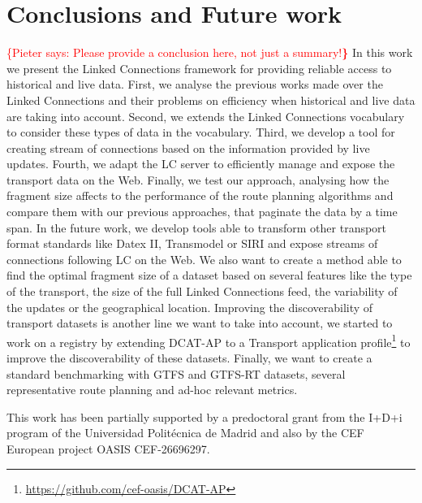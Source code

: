 \documentclass[sw]{iosart2x}
\newcommand{\pc}[1]{\noindent\textcolor{red}{\{Pieter says: #1{\bf \}}}}
\begin{document}
\section{Conclusions and Future work}
\pc{Please provide a conclusion here, not just a summary!}
In this work we present the Linked Connections framework for providing reliable access to historical and live data. First, we analyse the previous works made over the Linked Connections and their problems on efficiency when historical and live data are taking into account. Second, we extends the Linked Connections vocabulary to consider these types of data in the vocabulary. Third, we develop a tool for creating stream of connections based on the information provided by live updates. Fourth, we adapt the LC server to efficiently manage and expose the transport data on the Web. Finally, we test our approach, analysing how the fragment size affects to the performance of the route planning algorithms and compare them with our previous approaches, that paginate the data by a time span.
In the future work, we develop tools able to transform other transport format standards like Datex II, Transmodel or SIRI and expose streams of connections following LC on the Web. We also want to create a method able to find the optimal fragment size of a dataset based on several features like the type of the transport, the size of the full Linked Connections feed, the variability of the updates or the geographical location. Improving the discoverability of transport datasets is another line we want to take into account, we started to work on a registry by extending DCAT-AP to a Transport application profile\footnote{\url{https://github.com/cef-oasis/DCAT-AP}} to improve the discoverability of these datasets. Finally, we want to create a standard benchmarking with GTFS and GTFS-RT datasets, several representative route planning and ad-hoc relevant metrics. 

\begin{acks}
This work has been partially supported by a predoctoral grant from the I+D+i program of the Universidad Polit\'ecnica de Madrid and also by the CEF European project OASIS CEF-26696297.
\end{acks}


\end{document}
